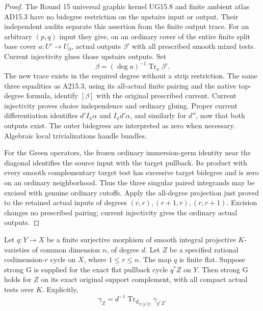 \begin{proof}
The Round 15 universal graphic kernel UG15.8 and finite ambient atlas
AD15.3 have no bidegree restriction on the upstairs input or output.
Their independent audits separate this assertion from the finite
output trace. For an arbitrary $(p,q)$ input they give, on an ordinary
cover of the entire finite split base cover $a:U'\to U_0$, actual
outputs $\beta'$ with all prescribed smooth mixed tests. Current
injectivity glues those upstairs outputs. Set
\[
                \beta=(\deg a)^{-1}\operatorname{Tr}_a\beta'.
\]
The new trace exists in the required degree without a strip
restriction. The same three equalities as A215.3, using its all-actual
finite pairing and the native top-degree formula, identify $[\beta]$
with the original prescribed current. Current injectivity proves
choice independence and ordinary gluing. Proper current differentiation
identifies $d'I_\pi\alpha$ and $I_\pi d'\alpha$, and similarly for
$d''$, now that both outputs exist. The outer bidegrees are interpreted
as zero when necessary. Algebraic local trivializations handle bundles.

For the Green operators, the frozen ordinary immersion-germ identity
near the diagonal identifies the source input with the target pullback.
Its product with every smooth complementary target test has excessive
target bidegree and is zero on an ordinary neighborhood. Thus the three
singular paired integrands may be excised with genuine ordinary cutoffs.
Apply the all-degree projection just proved to the retained actual
inputs of degrees $(r,r),(r+1,r),(r,r+1)$. Excision changes no prescribed
pairing; current injectivity gives the ordinary actual outputs.
\end{proof}

\begin{theorem}
\label{r16fc:exact-support}
Let $q:Y\to X$ be a finite surjective morphism of smooth integral
projective $K$-varieties of common dimension $n$, of degree $d$.
Let $Z$ be a specified rational codimension-$r$ cycle on $X$, where
$1\leq r\leq n$. The map $q$ is finite flat. Suppose strong G is
supplied for the exact flat pullback cycle $q^*Z$ on $Y$.
Then strong G holds for $Z$ on its exact original support complement,
with all compact actual tests over $K$. Explicitly,
\[
 \gamma_Z=d^{-1}\operatorname{Tr}_{q|_{Y\setminus|q^*Z|}}\gamma_{q^*Z}.
 \tag{FD16.1}\label{r16fc:Green-descent}
\]
\end{theorem}

